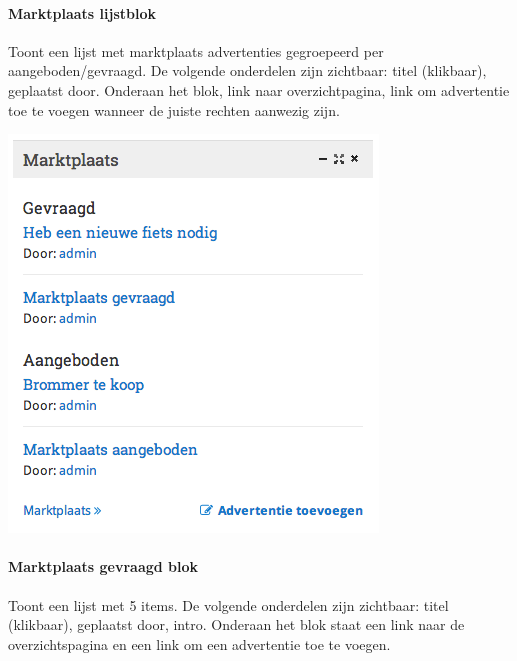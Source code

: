 \paragraph{Marktplaats lijstblok}

Toont een lijst met marktplaats advertenties gegroepeerd per aangeboden/gevraagd. De volgende onderdelen zijn zichtbaar: titel (klikbaar), geplaatst door. Onderaan het blok, link naar overzichtpagina, link om advertentie toe te voegen wanneer de juiste rechten aanwezig zijn.

\begin{center}
	\includegraphics[scale=0.5]{img/blokken/marktplaatslijst.png}
\end{center}

\paragraph{Marktplaats gevraagd blok}

Toont een lijst met 5 items. De volgende onderdelen zijn zichtbaar: titel (klikbaar), geplaatst door, intro. Onderaan het blok staat een link naar de overzichtspagina en een link om een advertentie toe te voegen.

